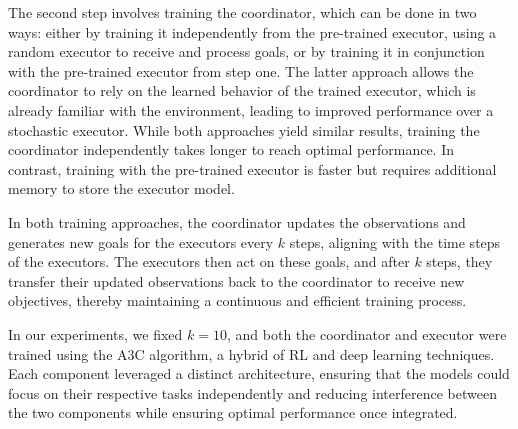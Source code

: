\documentclass[preprint,12pt]{elsarticle}
\begin{document}
The second step involves training the coordinator, which can be done in two ways: either by training it independently from the pre-trained executor, using a random executor to receive and process goals, or by training it in conjunction with the pre-trained executor from step one. The latter approach allows the coordinator to rely on the learned behavior of the trained executor, which is already familiar with the environment, leading to improved performance over a stochastic executor. While both approaches yield similar results, training the coordinator independently takes longer to reach optimal performance. In contrast, training with the pre-trained executor is faster but requires additional memory to store the executor model.

In both training approaches, the coordinator updates the observations and generates new goals for the executors every $k$ steps, aligning with the time steps of the executors. The executors then act on these goals, and after $k$ steps, they transfer their updated observations back to the coordinator to receive new objectives, thereby maintaining a continuous and efficient training process.

In our experiments, we fixed $k = 10$, and both the coordinator and executor were trained using the A3C algorithm, a hybrid of RL and deep learning techniques. Each component leveraged a distinct architecture, ensuring that the models could focus on their respective tasks independently and reducing interference between the two components while ensuring optimal performance once integrated.

\end{document}
